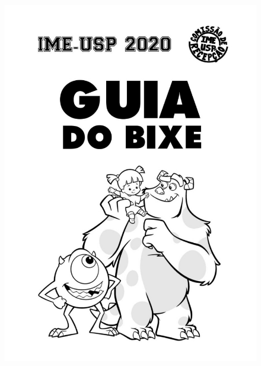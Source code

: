 \documentclass[12pt]{report}
\begin{document}
\begin{figure}[p]
    \includegraphics[height=1.05\textheight]{img/capa_2020.jpeg} %
\end{figure}
\thispagestyle{empty} %
\clearpage
\newpage





\end{document}

